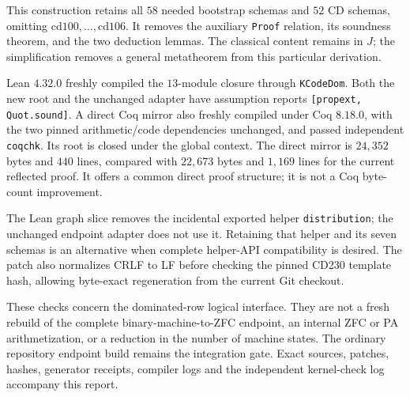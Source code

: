 This construction retains all \(58\) needed bootstrap schemas and
\(52\) CD schemas, omitting \(\mathrm{cd100},\ldots,\mathrm{cd106}\).
It removes the auxiliary \texttt{Proof} relation, its soundness theorem,
and the two deduction lemmas. The classical content remains in \(J\);
the simplification removes a general metatheorem from this particular
derivation.

Lean \(4.32.0\) freshly compiled the \(13\)-module closure through
\texttt{KCodeDom}. Both the new root and the unchanged adapter have
assumption reports \texttt{[propext, Quot.sound]}.
A direct Coq mirror also freshly compiled under Coq \(8.18.0\), with
the two pinned arithmetic/code dependencies unchanged, and passed
independent \texttt{coqchk}. Its root is closed under the global context.
The direct mirror is \(24{,}352\) bytes and \(440\) lines, compared with
\(22{,}673\) bytes and \(1{,}169\) lines for the current reflected proof.
It offers a common direct proof structure; it is not a Coq byte-count
improvement.

The Lean graph slice removes the incidental exported helper
\texttt{distribution}; the unchanged endpoint adapter does not use it.
Retaining that helper and its seven schemas is an alternative when
complete helper-API compatibility is desired. The patch also normalizes
CRLF to LF before checking the pinned CD230 template hash, allowing
byte-exact regeneration from the current Git checkout.

These checks concern the dominated-row logical interface. They are not
a fresh rebuild of the complete binary-machine-to-ZFC endpoint, an
internal ZFC or PA arithmetization, or a reduction in the number of
machine states. The ordinary repository endpoint build remains the
integration gate. Exact sources, patches, hashes, generator receipts,
compiler logs and the independent kernel-check log accompany this report.
